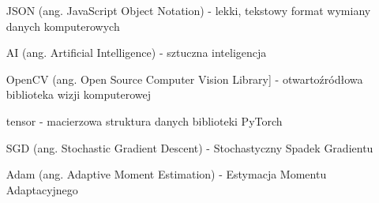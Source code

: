 \begin{itemize}
    \item[JSON] (ang. JavaScript Object Notation) - lekki, tekstowy format wymiany danych komputerowych
    \item[AI] (ang. Artificial Intelligence) - sztuczna inteligencja
    \item[OpenCV] (ang. Open Source Computer Vision Library] - otwartoźródłowa biblioteka wizji komputerowej
    \item[tensor] - macierzowa struktura danych biblioteki PyTorch
    \item[SGD] (ang. Stochastic Gradient Descent) - Stochastyczny Spadek Gradientu
    \item[Adam] (ang. Adaptive Moment Estimation) - Estymacja Momentu Adaptacyjnego


  \end{itemize}
